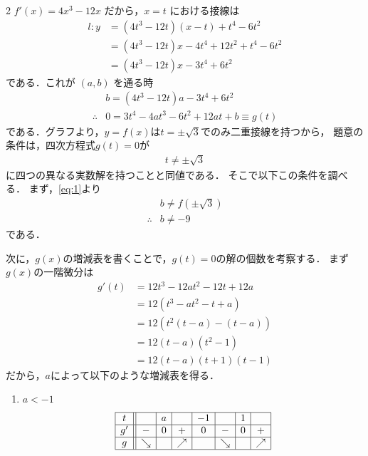 \documentclass[../../main.tex]{subfiles}
\begin{document}
\begin{multicols}{2}
  $f'(x) = 4x^3 - 12x$ だから，$x=t$ における接線は
  \begin{align}
    l: y
    & = (4t^3 - 12t) (x-t) + t^4 - 6t^2           \\
    & = (4t^3 - 12t)x - 4t^4 + 12t^2 + t^4 - 6t^2 \\
    & = (4t^3 - 12t)x - 3t^4 + 6t^2
  \end{align}
  である．これが $(a,b)$ を通る時
  \begin{align}
    & b = (4t^3 - 12t)a - 3t^4 + 6t^2                \\
    \therefore
    & 0 = 3t^4 - 4at^3 - 6t^2 + 12at + b \equiv g(t)
  \end{align}
  である．グラフより，$y=f(x)$は$t=\pm\sqrt{3}$でのみ二重接線を持つから，
  題意の条件は，四次方程式$g(t)=0$が
  \begin{align}
    t\neq\pm\sqrt{3} \label{eq:1}
  \end{align}
  に四つの異なる実数解を持つことと同値である．
  そこで以下この条件を調べる．
  まず，\cref{eq:1}より
  \begin{align}
    & b \neq f(\pm \sqrt{3})       \\
    \therefore
    & b \neq -9\label{eq:2}
  \end{align}
  である．

  次に，$g(x)$の増減表を書くことで，$g(t)=0$の解の個数を考察する．
  まず$g(x)$の一階微分は
  \begin{align}
    g'(t)
    & = 12t^3 - 12at^2 - 12t + 12a \\
    & = 12 (t^3 - at^2 - t + a)    \\
    & = 12 (t^2(t-a) - (t-a))      \\
    & = 12 (t-a) (t^2 - 1)         \\
    & = 12 (t-a) (t+1) (t-1)
  \end{align}
  だから，$a$によって以下のような増減表を得る．

  \begin{enumerate}
    \item $a < -1$
      \begin{align}
        \begin{array}{|c||c|c|c|c|c|c|c|}
          \hline
          t  &          & a &          & -1 &          & 1 &          \\
          \hline
          g' & -        & 0 & +        & 0  & -        & 0 & +        \\
          \hline
          g  & \searrow &   & \nearrow &    & \searrow &   & \nearrow \\
          \hline
        \end{array}
      \end{align}


\end{enumerate}
\end{multicols}
\end{document}
